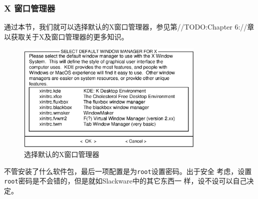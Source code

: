\subsubsection{X 窗口管理器}
\label{sec:installation:setup:configure:xWindowManager}

通过本节，我们就可以选择默认的X窗口管理器，参见第//TODO:Chapter 6://章
以获取关于X及窗口管理器的更多知识。
\begin{figure}[htpb]
  \centering
  \includegraphics[width=0.8\textwidth]{images/installation/setup-xwmconfig.eps}
  \caption{选择默认的X窗口管理器}
  \label{fig:setup-xwmconfig}
\end{figure}

不管安装了什么软件包，最后一项配置是为\texttt{root}设置密码。出于安全
考虑，设置\texttt{root}密码是不会错的，但是就如Slackware中的其它东西一
样，设不设可以自己决定。





